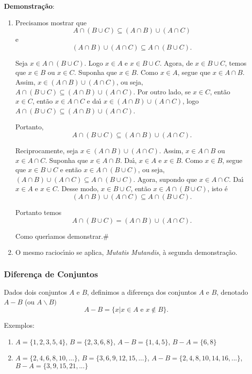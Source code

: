 \textbf{Demonstra{\c c}{\~a}o}:
\begin{enumerate}
\item Precisamos mostrar que
\[A\cap(B\cup C)\subseteq(A\cap B)\cup(A\cap C)\]
e
\[(A\cap B)\cup(A\cap C)\subseteq A\cap(B\cup C).\]

Seja $x\in A\cap(B\cup C)$. Logo $x\in A$ e $x\in B\cup C$. Agora, de $x\in B\cup C$, temos que $x\in B$ ou $x\in C$. Suponha que $x\in B$. Como $x\in A$, segue que $x\in A\cap B$. Assim, $x\in(A\cap B)\cup(A\cap C)$, ou seja, $A\cap(B\cup C)\subseteq(A\cap B)\cup(A\cap C)$. Por outro lado, se $x\in C$, ent{\~a}o $x\in C$, ent{\~a}o $x\in A\cap C$ e da{\'\i} $x\in(A\cap B)\cup(A\cap C)$, logo $A\cap(B\cup C)\subseteq(A\cap B)\cup(A\cap C)$.

Portanto,
\[A\cap(B\cup C)\subseteq(A\cap B)\cup(A\cap C).\]

Reciprocamente, seja $x\in(A\cap B)\cup(A\cap C)$. Assim, $x\in A\cap B$ ou $x\in A\cap C$. Suponha que $x\in A\cap B$. Da{\'\i}, $x\in A$ e $x\in B$. Como $x\in B$, segue que $x\in B\cup C$ e ent{\~a}o $x\in A\cap(B\cup C)$, ou seja, $(A\cap B)\cup(A\cap C)\subseteq A\cap(B\cup C)$. Agora, supondo que $x\in A\cap C$. Da{\'\i} $x\in A$ e $x\in C$. Desse modo, $x\in B\cup C$, ent{\~a}o $x\in A\cap(B\cup C)$, isto {\'e}
\[(A\cap B)\cup(A\cap C)\subseteq A\cap(B\cup C).\]

Portanto temos \[A\cap(B\cup C)=(A\cap B)\cup(A\cap C).\]

Como quer{\'\i}amos demonstrar.\#
\item O mesmo racioc{\'\i}nio se aplica, \textit{Mutatis Mutandis}, {\`a} segunda demonstra{\c c}{\~a}o.
\end{enumerate}

\subsubsection{Diferen{\c c}a de Conjuntos}
\begin{definicao} Dados dois conjuntos $A$ e $B$, definimos a diferen{\c c}a dos conjuntos $A$ e $B$, denotado $A-B$ (ou $A\backslash B)$
\[A - B = \{x | x \in A \mbox{ e } x \notin B\}.\]
\end{definicao}

Exemplos:
\begin{enumerate}
\item $A=\{1,2,3,5,4\}$, $B=\{2,3,6,8\}$, $A-B=\{1,4,5\}$, $B-A=\{6,8\}$
\item $A=\{2,4,6,8,10,...\}$,  $B=\{3,6,9,12,15,...\}$, $A-B=\{2,4,8,10,14,16,...\}$, $B - A=\{3,9,15,21,...\}$
\end{enumerate}

